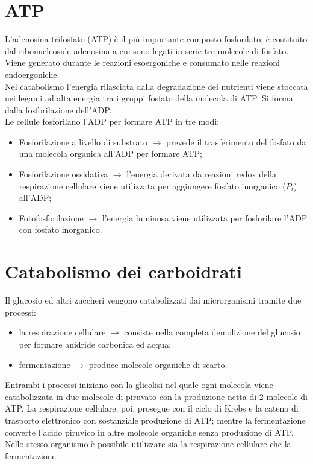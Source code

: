 \section{ATP}
L'adenosina trifosfato (ATP) \`e il pi\`u importante composto fosforilato; \`e costituito dal ribonucleoside adenosina a cui sono legati in serie tre molecole di fosfato. Viene generato durante le reazioni esoergoniche e consumato nelle reazioni endoergoniche. 
\\Nel catabolismo l'energia rilasciata dalla degradazione dei nutrienti viene stoccata nei legami ad alta energia tra i gruppi fosfato della molecola di ATP. Si forma dalla fosforilazione dell'ADP.
\\Le cellule fosforilano l'ADP per formare ATP in tre modi:
\begin{itemize}
    \item Fosforilazione a livello di substrato $\xrightarrow{}$ prevede il trasferimento del fosfato da una molecola organica all'ADP per formare ATP;
    \item Fosforilazione ossidativa $\xrightarrow{}$ l'energia derivata da reazioni redox della respirazione cellulare viene utilizzata per aggiungere fosfato inorganico ($P_i$) all'ADP; \item Fotofosforilazione $\xrightarrow{}$ l'energia luminosa viene utilizzata per fosforilare l'ADP con fosfato inorganico.
\end{itemize}
\section {Catabolismo dei carboidrati}
Il glucosio ed altri zuccheri vengono catabolizzati dai microrganismi tramite due processi: 
\begin{itemize}
    \item la respirazione cellulare $\xrightarrow{}$ consiste nella completa demolizione del glucosio per formare anidride carbonica ed acqua;
    \item fermentazione $\xrightarrow{}$ produce molecole organiche di scarto.
\end{itemize}
Entrambi i processi iniziano con la glicolisi nel quale ogni molecola viene catabolizzata in due molecole di piruvato con la produzione netta di 2 molecole di ATP. La respirazione cellulare, poi, prosegue con il ciclo di Krebs e la catena di trasporto elettronico con sostanziale produzione di ATP; mentre la fermentazione converte l'acido piruvico in altre molecole organiche senza produzione di ATP. Nello stesso organismo \`e possibile utilizzare sia la respirazione cellulare che la fermentazione.
